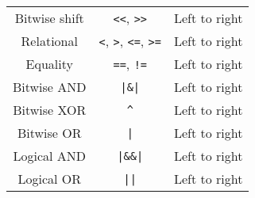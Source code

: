 \documentclass{article}
\begin{document}
\begin{table}[H]
\begin{tabular}{c c c}
        Bitwise shift                 & \texttt{<<}, \texttt{>>}                                                                                                                                                                                    & Left to right                  \\
        Relational                    & \texttt{<}, \texttt{>}, \texttt{<=}, \texttt{>=}                                                                                                                                              & Left to right                  \\
        Equality                      & \texttt{==}, \texttt{!=}                                                                                                                                                                                    & Left to right                  \\
        Bitwise AND                   & \texttt{|\&|}                                                                                                                                                                                     & Left to right                  \\
        Bitwise XOR                   & \texttt{^}                                                                                                                                                                                                         & Left to right                  \\
        Bitwise OR                    & \texttt{|}                                                                                                                                                                                                         & Left to right                  \\
        Logical AND                   & \texttt{|\&\&|}                                                                                                                                                                                   & Left to right                  \\
        Logical OR                    & \texttt{||}                                                                                                                                                                                                        & Left to right                  \\

\end{tabular}
\end{table}
\end{document}

